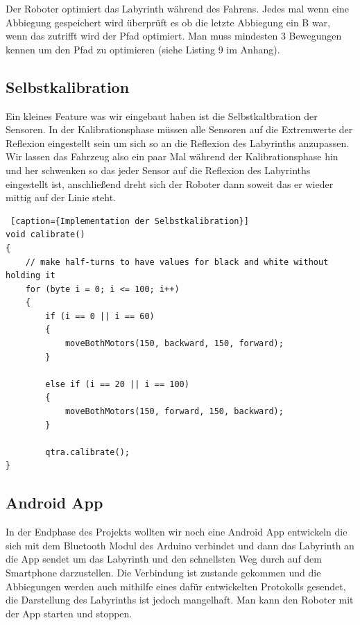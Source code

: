 \documentclass[12pt]{article}
\begin{document}
Der Roboter optimiert das Labyrinth während des Fahrens. Jedes mal wenn eine Abbiegung gespeichert wird überprüft es ob die letzte Abbiegung ein B war, wenn das zutrifft wird der Pfad optimiert. Man muss mindesten 3 Bewegungen kennen um den Pfad zu optimieren (siehe Listing 9 im Anhang). 

\subsection{Selbstkalibration}
Ein kleines Feature was wir eingebaut haben ist die Selbstkaltbration der Sensoren. In der Kalibrationsphase müssen alle Sensoren auf die Extremwerte der Reflexion eingestellt sein um sich so an die Reflexion des Labyrinths anzupassen. Wir lassen das Fahrzeug also ein paar Mal während der Kalibrationsphase hin und her schwenken so das jeder Sensor auf die Reflexion des Labyrinths eingestellt ist, anschließend dreht sich der Roboter dann soweit das er wieder mittig auf der Linie steht.
\begin{lstlisting} [caption={Implementation der Selbstkalibration}]
void calibrate()
{
    // make half-turns to have values for black and white without holding it
    for (byte i = 0; i <= 100; i++)
    {
        if (i == 0 || i == 60)
        {
            moveBothMotors(150, backward, 150, forward);
        }

        else if (i == 20 || i == 100)
        {
            moveBothMotors(150, forward, 150, backward);
        }

        qtra.calibrate();
}
\end{lstlisting}

\subsection{Android App} In der Endphase des Projekts wollten wir noch eine Android App entwickeln die sich mit dem Bluetooth Modul des Arduino verbindet und dann das Labyrinth an die App sendet um das Labyrinth  und den schnellsten Weg durch auf dem Smartphone darzustellen. Die Verbindung ist zustande gekommen und die Abbiegungen werden auch mithilfe eines dafür entwickelten Protokolls gesendet, die Darstellung des Labyrinths ist jedoch mangelhaft. Man kann den Roboter mit der App starten und stoppen.
\end{document}
